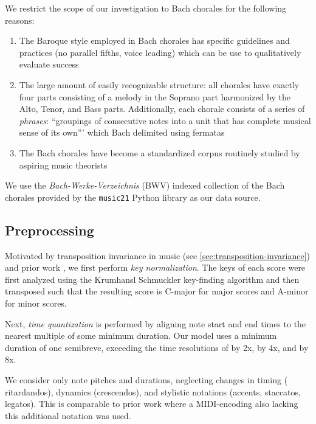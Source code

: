We restrict the scope of our investigation to Bach chorales for the following reasons:
\begin{enumerate}
  \item The Baroque style employed in Bach chorales has specific guidelines and
    practices \citep{piston1978harmony} (\eg no parallel fifths, voice leading)
    which can be use to qualitatively evaluate success
  \item The large amount of easily recognizable structure: all chorales have
    exactly four parts consisting of a melody in the Soprano part harmonized by
    the Alto, Tenor, and Bass parts. Additionally, each chorale consists of a
    series of \emph{phrases}: ``groupings of consecutive notes into a unit that
    has complete musical sense of its own'''\citep{nattiez1990music} which Bach
    delimited using fermatas
  \item The Bach chorales have become a standardized corpus routinely studied
    by aspiring music theorists\citep{white2002guidelines}
\end{enumerate}
We use the \emph{Bach-Werke-Verzeichnis} (BWV) \citep{butt1999bach} indexed
collection of the Bach chorales provided by the
\texttt{music21}\citep{Scott2015} Python library as our data source.

\subsection{Preprocessing}


Motivated by transposition invariance in music (see
\vref{sec:transposition-invariance}) and prior work
\citep{mozer1994neural,Eck2002,franklin2004recurrent,franklin2005jazz}, we
first perform \emph{key normalization}. The keys of each score were first
analyzed using the Krumhansl Schmuckler key-finding algorithm
\citep{krumhansl2001cognitive} and then transposed such that the resulting
score is C-major for major scores and A-minor for minor scores.

Next, \emph{time quantization} is performed by aligning note start and end
times to the nearest multiple of some minimum duration. Our model uses a
minimum duration of one semibreve, exceeding the time resolutions of
\citep{Boulanger-Lewandowski2012,Eck2002} by 2x,
\citep{hild1991harmonet} by 4x, and \citep{bellgard1994harmonizing} by 8x.

We consider only note pitches and durations, neglecting changes in timing (\eg
ritardandos), dynamics (\eg crescendos), and stylistic notations (\eg accents,
staccatos, legatos). This is comparable to prior work
\citep{Boulanger-Lewandowski2012,pascanu2013construct} where a MIDI-encoding
also lacking this additional notation was used.

